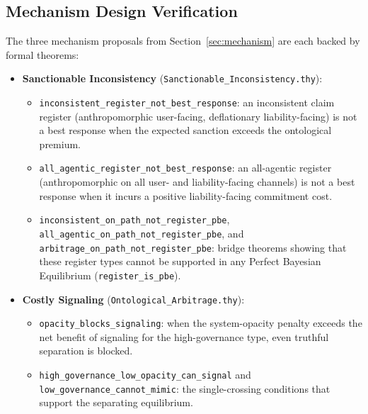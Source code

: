 \subsection*{Mechanism Design Verification}

The three mechanism proposals from Section~\ref{sec:mechanism} are each backed by formal theorems:
\begin{itemize}
    \item \textbf{Sanctionable Inconsistency} (\texttt{Sanctionable\_Inconsistency.thy}):
      \begin{itemize}
        \item \texttt{inconsistent\_\allowbreak{}register\_\allowbreak{}not\_\allowbreak{}best\_\allowbreak{}response}: an inconsistent claim register (anthropomorphic user-facing, deflationary liability-facing) is not a best response when the expected sanction exceeds the ontological premium.
        \item \texttt{all\_\allowbreak{}agentic\_\allowbreak{}register\_\allowbreak{}not\_\allowbreak{}best\_\allowbreak{}response}: an all-agentic register (anthropomorphic on all user- and liability-facing channels) is not a best response when it incurs a positive liability-facing commitment cost.
        \item \texttt{inconsistent\_\allowbreak{}on\_\allowbreak{}path\_\allowbreak{}not\_\allowbreak{}register\_\allowbreak{}pbe}, \texttt{all\_\allowbreak{}agentic\_\allowbreak{}on\_\allowbreak{}path\_\allowbreak{}not\_\allowbreak{}register\_\allowbreak{}pbe}, and \texttt{arbitrage\_\allowbreak{}on\_\allowbreak{}path\_\allowbreak{}not\_\allowbreak{}register\_\allowbreak{}pbe}: bridge theorems showing that these register types cannot be supported in any Perfect Bayesian Equilibrium (\texttt{register\_\allowbreak{}is\_\allowbreak{}pbe}).
      \end{itemize}
    \item \textbf{Costly Signaling} (\texttt{Ontological\_\allowbreak{}Arbitrage.thy}):
      \begin{itemize}
        \item \texttt{opacity\_\allowbreak{}blocks\_\allowbreak{}signaling}: when the system-opacity penalty exceeds the net benefit of signaling for the high-governance type, even truthful separation is blocked.
        \item \texttt{high\_\allowbreak{}governance\_\allowbreak{}low\_\allowbreak{}opacity\_\allowbreak{}can\_\allowbreak{}signal} and \texttt{low\_\allowbreak{}governance\_\allowbreak{}cannot\_\allowbreak{}mimic}: the single-crossing conditions that support the separating equilibrium.

\end{itemize}
\end{itemize}
